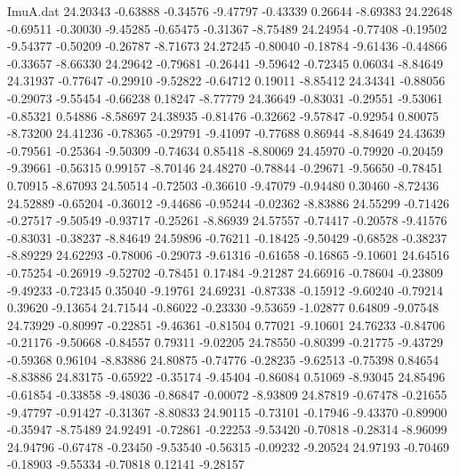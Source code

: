 \begin{filecontents}{ImuA.dat}
  24.20343   -0.63888   -0.34576   -9.47797   -0.43339    0.26644   -8.69383
  24.22648   -0.69511   -0.30030   -9.45285   -0.65475   -0.31367   -8.75489
  24.24954   -0.77408   -0.19502   -9.54377   -0.50209   -0.26787   -8.71673
  24.27245   -0.80040   -0.18784   -9.61436   -0.44866   -0.33657   -8.66330
  24.29642   -0.79681   -0.26441   -9.59642   -0.72345    0.06034   -8.84649
  24.31937   -0.77647   -0.29910   -9.52822   -0.64712    0.19011   -8.85412
  24.34341   -0.88056   -0.29073   -9.55454   -0.66238    0.18247   -8.77779
  24.36649   -0.83031   -0.29551   -9.53061   -0.85321    0.54886   -8.58697
  24.38935   -0.81476   -0.32662   -9.57847   -0.92954    0.80075   -8.73200
  24.41236   -0.78365   -0.29791   -9.41097   -0.77688    0.86944   -8.84649
  24.43639   -0.79561   -0.25364   -9.50309   -0.74634    0.85418   -8.80069
  24.45970   -0.79920   -0.20459   -9.39661   -0.56315    0.99157   -8.70146
  24.48270   -0.78844   -0.29671   -9.56650   -0.78451    0.70915   -8.67093
  24.50514   -0.72503   -0.36610   -9.47079   -0.94480    0.30460   -8.72436
  24.52889   -0.65204   -0.36012   -9.44686   -0.95244   -0.02362   -8.83886
  24.55299   -0.71426   -0.27517   -9.50549   -0.93717   -0.25261   -8.86939
  24.57557   -0.74417   -0.20578   -9.41576   -0.83031   -0.38237   -8.84649
  24.59896   -0.76211   -0.18425   -9.50429   -0.68528   -0.38237   -8.89229
  24.62293   -0.78006   -0.29073   -9.61316   -0.61658   -0.16865   -9.10601
  24.64516   -0.75254   -0.26919   -9.52702   -0.78451    0.17484   -9.21287
  24.66916   -0.78604   -0.23809   -9.49233   -0.72345    0.35040   -9.19761
  24.69231   -0.87338   -0.15912   -9.60240   -0.79214    0.39620   -9.13654
  24.71544   -0.86022   -0.23330   -9.53659   -1.02877    0.64809   -9.07548
  24.73929   -0.80997   -0.22851   -9.46361   -0.81504    0.77021   -9.10601
  24.76233   -0.84706   -0.21176   -9.50668   -0.84557    0.79311   -9.02205
  24.78550   -0.80399   -0.21775   -9.43729   -0.59368    0.96104   -8.83886
  24.80875   -0.74776   -0.28235   -9.62513   -0.75398    0.84654   -8.83886
  24.83175   -0.65922   -0.35174   -9.45404   -0.86084    0.51069   -8.93045
  24.85496   -0.61854   -0.33858   -9.48036   -0.86847   -0.00072   -8.93809
  24.87819   -0.67478   -0.21655   -9.47797   -0.91427   -0.31367   -8.80833
  24.90115   -0.73101   -0.17946   -9.43370   -0.89900   -0.35947   -8.75489
  24.92491   -0.72861   -0.22253   -9.53420   -0.70818   -0.28314   -8.96099
  24.94796   -0.67478   -0.23450   -9.53540   -0.56315   -0.09232   -9.20524
  24.97193   -0.70469   -0.18903   -9.55334   -0.70818    0.12141   -9.28157

\end{filecontents}
